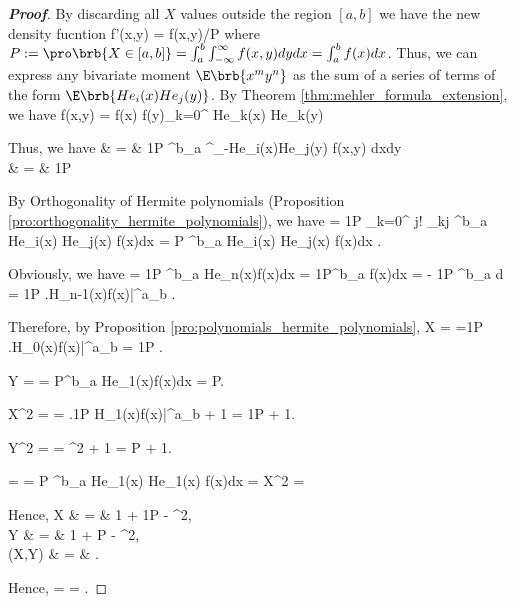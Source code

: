 \begin{proof}[\bf Proof]
By discarding all $X$ values outside the region $[a,b]$ we have the new density fucntion \be f'(x,y) = f(x,y)/P \ee where $P := \pro\brb{X\in [a,b]} = \int^b_a \int^\infty_{-\infty} f(x,y) dy dx = \int^b_a f(x)dx$. Thus, we
can express any bivariate moment $\E \brb{x^my^n}$ as the sum of a series of terms of the form $\E \brb{He_i(x)He_j(y)}$. By Theorem \ref{thm:mehler_formula_extension}, we have \be f(x,y) = f(x) f(y)\sum_{k=0}^\infty
{} He_k(x) He_k(y)\ee


Thus, we have \beast \E {} & = & \frac 1P \int^b_a \int^\infty_{-\infty}He_i(x)He_j(y) f(x,y) dxdy \\
& = & \frac 1P  \eeast

By Orthogonality of Hermite polynomials (Proposition \ref{pro:orthogonality_hermite_polynomials}), we have \be \E {} =  \frac 1P \sum_{k=0}^\infty {} \sqrt{2 \pi} j! \delta_{kj} \int^b_a
He_i(x) He_j(x) f(x)dx  = P \int^b_a He_i(x) He_j(x) f(x)dx . \ee

Obviously, we have \be  \E{} = \frac 1P \int^b_a He_n(x)f(x)dx = \frac 1P\int^b_a f(x)dx = - \frac 1P \int^b_a d = \frac 1P \left.H_{n-1}(x)f(x)\right|^a_b\nonumber
.\ee

Therefore, by Proposition \ref{pro:polynomials_hermite_polynomials}, \be \E X =  \E{} =\frac 1P \left.H_0(x)f(x)\right|^a_b = \frac 1P . \ee

\be \E Y =  \E{} =  \frac {\rho}P\int^b_a He_1(x)f(x)dx  = \frac {\rho}P. \ee

\be \E X^2 = \E{} = \left.\frac 1P H_1(x)f(x)\right|^a_b + 1 = \frac 1P  + 1.\ee

\be \E Y^2 = \E{} = \rho^2 \E{} + 1 = P  + 1.\ee

\be \E {} = \E{} = \frac {\rho}P \int^b_a He_1(x) He_1(x) f(x)dx = \rho \E X^2 = \rho{} \ee


Hence, \beast \var X & = & 1 + \frac 1P   - ^2,\\
\var Y & = & 1 + P  - ^2,\\
\cov(X,Y) & = & \rho{} . \eeast

Hence, \be \wh{\rho} =  = \rho{}. \ee
\end{proof}


